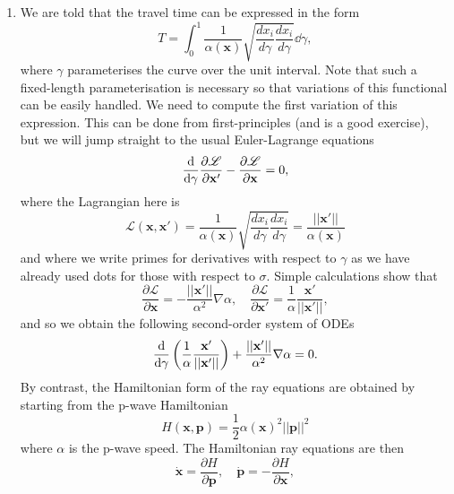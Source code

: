 \documentclass[a4paper,10pt]{paper}
\begin{document}
\begin{enumerate}
\item We are told that the travel time can be expressed in the form
\begin{equation*}
    T=\int_{0}^{1}\frac{1}{\alpha(\mathbf{x})}\sqrt{\frac{dx_{i}}{d\gamma}\frac{dx_{i}}{d\gamma}}\dd\gamma,
\end{equation*}
where $\gamma$ parameterises the curve over the unit interval. Note that such a fixed-length parameterisation is necessary so that variations of this functional can be easily handled. We need to compute the first variation of this expression. This can be done from first-principles (and is a good exercise), but we will jump straight to the usual Euler-Lagrange equations
\begin{equation*}
    \frac{\mathrm{d}}{\mathrm{d}\gamma}\frac{\partial\mathscr{L}}{\partial \mathbf{x}'}-\frac{\partial\mathscr{L}}{\partial \mathbf{x}}=0,
\end{equation*}
where the Lagrangian here is
\begin{equation*}
    \mathscr{L}(\mathbf{x},\mathbf{x}')=\frac{1}{\alpha(\mathbf{x})}\sqrt{\frac{dx_{i}}{d\gamma}\frac{dx_{i}}{d\gamma}} = \frac{||\mathbf{x}'||}{\alpha(\mathbf{x})}
\end{equation*}
and where we write primes for derivatives with respect to $\gamma$ as we have already used dots for those with respect to $\sigma$. Simple calculations show that
\begin{equation*}
    \frac{\partial\mathscr{L}}{\partial \mathbf{x}}=-\frac{||\mathbf{x}'||}{\alpha^{2}}\nabla\alpha, \quad \frac{\partial\mathscr{L}}{\partial \mathbf{x}'}=\frac{1}{\alpha}\frac{\mathbf{x}'}{||\mathbf{x}'||},
\end{equation*}
and so we obtain the following second-order system of ODEs
\begin{equation*}
    \frac{\mathrm{d}}{\mathrm{d}\gamma}\left(\frac{1}{\alpha}\frac{\mathbf{x}'}{||\mathbf{x}'||}\right)+\frac{||\mathbf{x}'||}{\alpha^{2}}\nabla\alpha=0.
\end{equation*}
By contrast, the Hamiltonian form of the ray equations are obtained by starting from the p-wave Hamiltonian
\begin{equation*}
    H(\mathbf{x},\mathbf{p})=\frac{1}{2}\alpha(\mathbf{x})^{2}||\mathbf{p}||^{2}
\end{equation*}
where $\alpha$ is the p-wave speed. The Hamiltonian ray equations are then
\begin{equation*}
    \dot{\mathbf{x}}=\frac{\partial H}{\partial \mathbf{p}}, \quad \dot{\mathbf{p}}=-\frac{\partial H}{\partial \mathbf{x}},

\end{equation*}
\end{enumerate}
\end{document}
